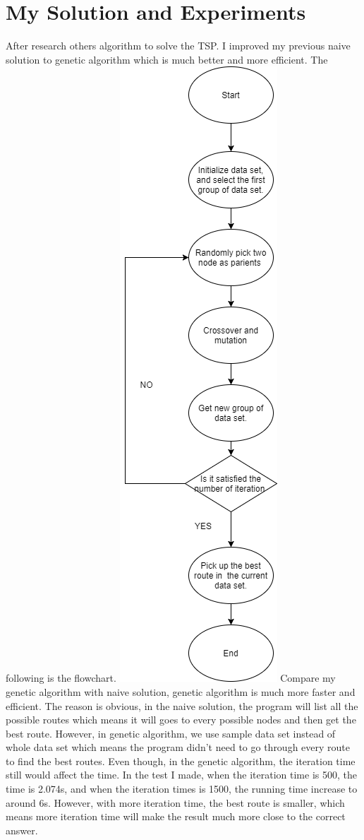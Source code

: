 \documentclass[a4paper,man,natbib]{apa6}
\begin{document}
\section{My Solution and Experiments}
After research others algorithm to solve the TSP. I improved my previous naive solution to genetic algorithm which is much better and more efficient. The following is the flowchart.
\includegraphics[width=0.3\linewidth]{3} 
\newline 
Compare my genetic algorithm with naive solution, genetic algorithm is much more faster and efficient. The reason is obvious, in the naive solution, the program will list all the possible routes which means it will goes to every possible nodes  and then get the best route. However, in genetic algorithm, we use sample data set instead of whole data set which means the program didn't need to go through every route to find the best routes. Even though, in the genetic algorithm, the iteration time still would affect the time. In the test I made, when the iteration time is 500, the time is 2.074s, and when the iteration times is 1500, the running time increase to around 6s. However, with more iteration time, the best route is smaller, which means more iteration time will make the result much more close to the correct answer.
\end{document}

